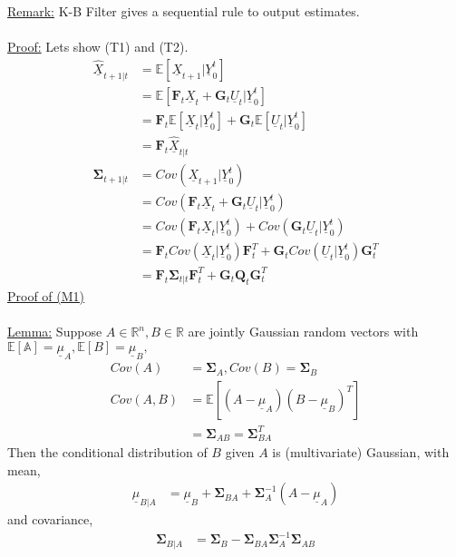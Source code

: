 \documentclass[a4paper,english,12pt]{article}
\begin{document}
\underline{Remark:} K-B Filter gives a sequential rule to output estimates.\\\\
\underline{Proof:} Lets show (T1) and (T2).
\begin{align*}
  \underline{\hat{X}}_{t+1|t}&=\mathbb{E}[\underline{X}_{t+1}|\underline{Y}_0^t]\\
  &=\mathbb{E}[\textbf{F}_t\underline{X}_t+ \textbf{G}_t\underline{U}_t|\underline{Y}_0^t]\\
  &=\textbf{F}_t\mathbb{E}[\underline{X}_t|\underline{Y}_0^t]+\textbf{G}_t\mathbb{E}[\underline{U}_t|\underline{Y}_0^t]\\
  &=\textbf{F}_t\underline{\hat{X}}_{t|t}\\
 \mathbf{\Sigma}_{t+1|t}&=Cov(\underline{X}_{t+1}|\underline{Y}_0^t)\\
 &=Cov(\textbf{F}_t\underline{X}_t+\textbf{G}_t\underline{U}_t|\underline{Y}_0^t)\\
 &=Cov(\textbf{F}_t\underline{X}_t|\underline{Y}_0^t)+Cov(\textbf{G}_t\underline{U}_t|\underline{Y}_0^t)\\
 &=\textbf{F}_tCov(\underline{X}_t|\underline{Y}_0^t)\textbf{F}_t^T+\textbf{G}_tCov(\underline{U}_t|\underline{Y}_0^t)\textbf{G}_t^T\\
 &=\textbf{F}_t\mathbf{\Sigma}_{t|t}\textbf{F}_t^T+\textbf{G}_t\textbf{Q}_t\textbf{G}_t^T
 \end{align*}
 \underline{Proof of (M1)}\\\\
 \underline{Lemma:} 
 Suppose $A \in \mathbb{R}^n, B \in\mathbb{R}$ are jointly Gaussian random vectors with $\mathbb{E[A]=\underline{\mu}}_A,
 \mathbb{E}[B]=\underline{\mu}_B,$
 \begin{align*}
 Cov(A)&=\mathbf{\Sigma}_A, Cov(B)=\mathbf{\Sigma}_B\\
 Cov(A,B)&=\mathbb{E}[(A-\underline{\mu}_A)(B-\underline{\mu}_B)^T]\\
 &=\mathbf{\Sigma}_{AB}=\mathbf{\Sigma}_{BA}^T
 \end{align*}
 Then the conditional distribution of $B$ given $A$ is (multivariate) Gaussian, with mean,
 \begin{align*}
 \underline{\mu}_{B|A}&=\underline{\mu}_B+\mathbf{\Sigma}_{BA}+\mathbf{\Sigma}_A^{-1}(A-\underline{\mu}_A)
 \end{align*}
 and covariance,
 \begin{align*}
 \mathbf{\Sigma}_{B|A}&=\mathbf{\Sigma}_B-\mathbf{\Sigma}_{BA}\mathbf{\Sigma}_A^{-1}\mathbf{\Sigma}_{AB}
 \end{align*}
\end{document}
